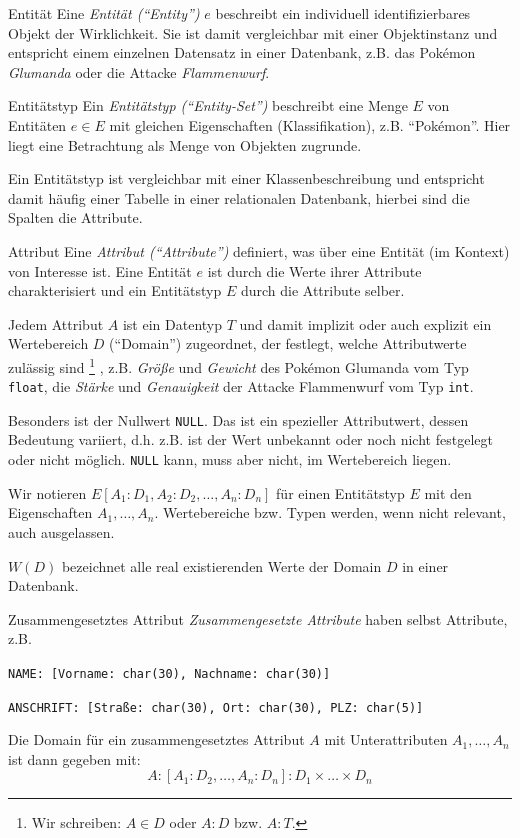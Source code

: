 \begin{defi}{Entität}
    Eine \emph{Entität (\enquote{Entity})} $e$ beschreibt ein individuell identifizierbares Objekt der Wirklichkeit.
    Sie ist damit vergleichbar mit einer Objektinstanz und entspricht einem einzelnen Datensatz in einer Datenbank, z.B. das Pokémon \emph{Glumanda} oder die Attacke \emph{Flammenwurf}.
\end{defi}

\begin{defi}{Entitätstyp}
    Ein \emph{Entitätstyp (\enquote{Entity-Set})} beschreibt eine Menge $E$ von Entitäten $e \in E$ mit gleichen Eigenschaften (Klassifikation), z.B. \enquote{Pokémon}.
    Hier liegt eine Betrachtung als Menge von Objekten zugrunde.

    Ein Entitätstyp ist vergleichbar mit einer Klassenbeschreibung und entspricht damit häufig einer Tabelle in einer relationalen Datenbank, hierbei sind die Spalten die Attribute.
\end{defi}

\begin{defi}{Attribut}
    Eine \emph{Attribut (\enquote{Attribute})} definiert, was über eine Entität (im Kontext) von Interesse ist.
    Eine Entität $e$ ist durch die Werte ihrer Attribute charakterisiert und ein Entitätstyp $E$ durch die Attribute selber.

    Jedem Attribut $A$ ist ein Datentyp $T$ und damit implizit oder auch explizit ein Wertebereich $D$ (\enquote{Domain}) zugeordnet, der festlegt, welche Attributwerte zulässig sind \footnote{Wir schreiben: $A \in D$ oder $A:D$ bzw. $A:T$.} , z.B. \emph{Größe} und \emph{Gewicht} des Pokémon Glumanda vom Typ \texttt{float}, die \emph{Stärke} und \emph{Genauigkeit} der Attacke Flammenwurf vom Typ \texttt{int}.

    Besonders ist der Nullwert \texttt{NULL}.
    Das ist ein spezieller Attributwert, dessen Bedeutung variiert, d.h. z.B. ist der Wert unbekannt oder noch nicht festgelegt oder nicht möglich.
    \texttt{NULL} kann, muss aber nicht, im Wertebereich liegen.

    Wir notieren $E[A_1 : D_1, A_2 : D_2, \ldots, A_n : D_n]$ für einen Entitätstyp $E$ mit den Eigenschaften $A_1, \ldots, A_n$.
    Wertebereiche bzw. Typen werden, wenn nicht relevant, auch ausgelassen.

    $W(D)$ bezeichnet alle real existierenden Werte der Domain $D$ in einer Datenbank.
\end{defi}

\begin{defi}{Zusammengesetztes Attribut}
    \emph{Zusammengesetzte Attribute} haben selbst Attribute, z.B.
    \begin{center}
        \texttt{NAME: [Vorname: char(30), Nachname: char(30)]}

        \texttt{ANSCHRIFT: [Straße: char(30), Ort: char(30), PLZ: char(5)]}
    \end{center}

    Die Domain für ein zusammengesetztes Attribut $A$ mit Unterattributen $A_1, \ldots, A_n$ ist dann gegeben mit:
    \[
        A: [A_1 : D_2, \ldots, A_n:D_n]: D_1 \times \ldots \times D_n
    \]
\end{defi}

